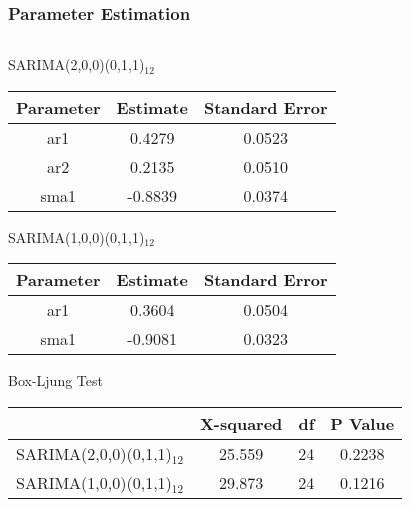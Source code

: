 \documentclass[]{beamer}
\begin{document}
\begin{frame}
	\frametitle{Parameter Estimation}
	\fontsize{5pt}{7.5}\selectfont
	\begin{columns}
		\hspace*{-2cm}
		\begin{column}{0.25\textwidth}
			\begin{table}[h!]
				\begin{center}
					SARIMA(2,0,0)(0,1,1)$_{12}$
				\end{center}
					\begin{tabular}{c| c| c}
							\hline
							Parameter & Estimate & Standard Error\\
							\hline
							ar1 & 0.4279 & 0.0523\\ 
							ar2 & 0.2135 & 0.0510 \\
							sma1 & -0.8839 & 0.0374\\
							\hline
						\end{tabular}
			\end{table}
			\begin{table}
				\begin{center}
					SARIMA(1,0,0)(0,1,1)$_{12}$\\
					\begin{tabular}{c| c| c}
						\hline
						Parameter & Estimate & Standard Error\\
						\hline
						ar1 & 0.3604 & 0.0504 \\
						sma1 & -0.9081 & 0.0323 \\
						\hline
					\end{tabular}
				\end{center}
			\end{table}
		\begin{table}[h!]
			\begin{center}
				Box-Ljung Test\\
				\begin{tabular}{c c c c}
					\hline
					& X-squared & df & P Value\\
					\hline
					SARIMA(2,0,0)(0,1,1)$_{12}$	& 25.559 & 24 & 0.2238\\
					SARIMA(1,0,0)(0,1,1)$_{12}$	& 29.873 & 24 & 0.1216\\
					\hline
				\end{tabular}
			\end{center}
		\end{table}
		\end{column}
		\begin{column}{.25\textwidth}
			\begin{table}[h!]

\end{table}
\end{column}
\end{columns}
\end{frame}
\end{document}
